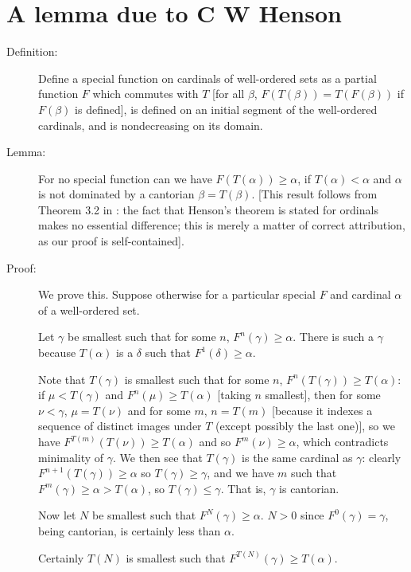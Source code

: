 \documentclass[12pt]{article}
\begin{document}
\section{A lemma due to C W Henson}


\begin{description}
\item[Definition:]  Define a special function on cardinals of well-ordered sets as a partial function $F$ which commutes with $T$ [for all $\beta$, $F(T(\beta))=T(F(\beta))$ if $F(\beta)$ is defined], is defined on an initial segment of the well-ordered cardinals, and is nondecreasing on its domain.

\item[Lemma:]  For no special function can we have $F(T(\alpha)) \geq \alpha$, if $T(\alpha)<\alpha$ and $\alpha$ is not dominated by a cantorian $\beta=T(\beta)$. [This result follows from Theorem 3.2 in \cite{henson}:  the fact that Henson's theorem is stated for ordinals makes no essential difference; this is merely a matter of correct attribution, as our proof is self-contained].

\item[Proof:]  We prove this.  Suppose otherwise for a particular special $F$ and cardinal $\alpha$ of a well-ordered set.

Let $\gamma$ be smallest such that for some $n$, $F^n(\gamma) \geq \alpha$.  There is such a $\gamma$ because $T(\alpha)$ is a $\delta$ such that $F^1(\delta)\geq\alpha$.

Note that $T(\gamma)$ is smallest such that for some $n$, $F^n(T(\gamma)) \geq T(\alpha)$:  if $\mu<T(\gamma)$ and $F^n(\mu) \geq T(\alpha)$ [taking $n$ smallest], then for some $\nu<\gamma$, $\mu=T(\nu)$ and for some $m$, $n=T(m)$ [because it indexes a sequence of distinct images under $T$ (except possibly the last one)], so we have $F^{T(m)}(T(\nu))\geq T(\alpha)$ and so $F^m(\nu) \geq \alpha$, which contradicts minimality of $\gamma$.   We then see that $T(\gamma)$ is the same cardinal as $\gamma$:
clearly $F^{n+1}(T(\gamma)) \geq \alpha$ so $T(\gamma)\geq \gamma$, and we have $m$ such that $F^m(\gamma) \geq \alpha > T(\alpha)$, so $T(\gamma) \leq \gamma$.   That is, $\gamma$ is cantorian.

Now let $N$ be smallest such that $F^N(\gamma)\geq \alpha$.  $N >0$ since $F^0(\gamma) = \gamma$, being cantorian, is certainly less than $\alpha$.

Certainly $T(N)$ is smallest such that $F^{T(N)}(\gamma) \geq T(\alpha)$.


\end{description}
\end{document}
